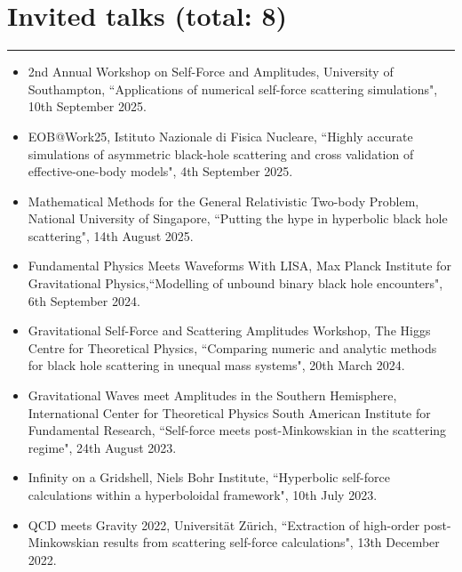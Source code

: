\documentclass[10.5pt, oneside]{article}   	%
\begin{document}
  {\color{Sectioncolour}
\section*{Invited talks {\rm (total: 8)}}
\vspace{-3mm}
\noindent\rule{\linewidth}{0.6pt}}
\begin{itemize}
\item 2nd Annual Workshop on Self-Force and Amplitudes, University of Southampton, ``Applications of numerical self-force scattering simulations", 10th September 2025.
\item EOB@Work25, Istituto Nazionale di Fisica Nucleare, ``Highly accurate simulations of asymmetric black-hole scattering and cross validation of effective-one-body models", 4th September 2025.
\item Mathematical Methods for the General Relativistic Two-body Problem, National University of Singapore, ``Putting the hype in hyperbolic black hole scattering", 14th August 2025.
\item Fundamental Physics Meets Waveforms With LISA, Max Planck Institute for Gravitational Physics,``Modelling of unbound binary black hole encounters", 6th September 2024.
\item Gravitational Self-Force and Scattering Amplitudes Workshop, The Higgs Centre for Theoretical Physics, ``Comparing numeric and analytic methods for black hole scattering in unequal mass systems", 20th March 2024.
\newpage
\item Gravitational Waves meet Amplitudes in the Southern Hemisphere, International Center for Theoretical Physics South American Institute for Fundamental Research, ``Self-force meets post-Minkowskian in the scattering regime", 24th August 2023.
\item Infinity on a Gridshell, Niels Bohr Institute, ``Hyperbolic self-force calculations within a hyperboloidal framework", 10th July 2023.
\item QCD meets Gravity 2022, Universität Zürich, ``Extraction of high-order post-Minkowskian results from scattering self-force calculations", 13th December 2022.
\end{itemize} 
\end{document}
